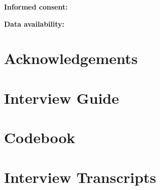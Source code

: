\documentclass[11pt,a4paper]{article}
\begin{document}
\noindent\textbf{Informed consent:} %

\noindent\textbf{Data availability:} %

\section*{Acknowledgements}



\appendix

\section{Interview Guide}
\label{app:interview-guide}

\section{Codebook}
\label{app:codebook}

\section{Interview Transcripts}
\label{app:transcripts}
\end{document}
